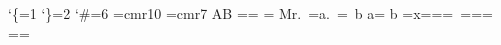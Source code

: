 \catcode`\{=1 \catcode`\}=2 \catcode`\#=6
\font\tenrm=cmr10 \tenrm \font\sevenrm=cmr7
\def\a{A}\def\b{B}\def\log#1{\xdef\L{\L#1}}\def\L{}
{\aftergroup\a\aftergroup\b \log{in}}\log{out}
\def\x{\log{x}}{{\aftergroup\x}\log{y}}
=\tenrm {}=\sevenrm
{=\sevenrm \xdef\inner{\fontname\textfont3}}
\edef\outer{\fontname\textfont3,\fontname\scriptfont3,\fontname\scriptscriptfont3}
\edef\thefont{\expandafter\noexpand\the\font}
\edef\csn{\csname\ifincsname yes\else no\fi\endcsname}
\edef\csm{\ifincsname yes\else no\fi}
\hbox{Mr. =\spacefactor a. =\spacefactor\ b}
\vbox{\hbox{a}=\prevdepth \prevdepth=5pt \hbox{b}}
\hbox{=\lastnodetype x=\lastnodetype \hskip1pt=\lastnodetype \kern1pt=\lastnodetype {} =\lastnodetype \hbox{}=\lastnodetype \vrule{}=\lastnodetype}
\vbox{\hbox{}=\lastnodetype \vbox{}=\lastnodetype}
